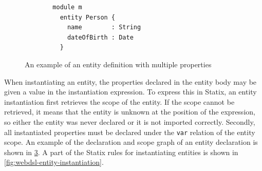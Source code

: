       \begin{figure}
        \begin{subfigure}[b]{0.3\textwidth}
          \begin{verbatim}
  module m
    entity Person { 
      name        : String
      dateOfBirth : Date
    }
          \end{verbatim}
          \caption{\label{fig:webdsl-entity-body-example-webdsl}}
        \end{subfigure}
        \begin{subfigure}[b]{0.7\textwidth}
          \centering
          \caption{\label{fig:webdsl-entity-body-example-sg}}
        \end{subfigure}
        \caption{\label{fig:webdsl-entity-body-example}An example of an entity definition with multiple properties}
      \end{figure}

      When instantiating an entity, the properties declared in the entity body may be given a value in the instantiation expression. To express this in Statix, an entity instantiation first retrieves the scope of the entity. If the scope cannot be retrieved, it means that the entity is unknown at the position of the expression, so either the entity was never declared or it is not imported correctly. Secondly, all instantiated properties must be declared under the \texttt{var} relation of the entity scope. An example of the declaration and scope graph of an entity declaration is shown in \cref{fig:webdsl-entity-body-example}. A part of the Statix rules for instantiating entities is shown in \cref{fig:webdsl-entity-instantiation}.

